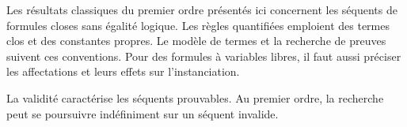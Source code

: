 \documentclass[../../../include/open-logic-section]{subfiles}
\begin{document}
Les résultats classiques du premier ordre présentés
ici concernent les séquents de formules closes sans
égalité logique. Les règles quantifiées emploient des
termes clos et des constantes propres. Le modèle de
termes et la recherche de preuves suivent ces
conventions. Pour des formules à variables libres,
il faut aussi préciser les affectations et leurs
effets sur l'instanciation.

La validité caractérise les séquents prouvables.
Au premier ordre, la recherche peut se poursuivre
%
%
indéfiniment sur un séquent invalide.
\end{document}
